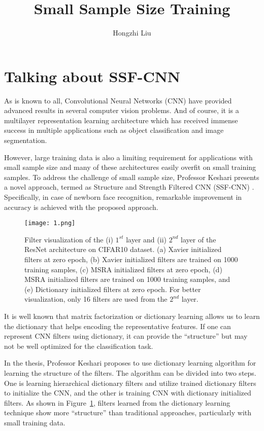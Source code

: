 \documentclass[twocolumn]{article}
\author{Hongzhi Liu}
\title{Small Sample Size Training}
\begin{document}
	\maketitle
	\par
	\section{Talking about SSF-CNN}
	As is known to all, Convolutional Neural Networks (CNN) have provided advanced results in several computer vision problems. And of course, it is a multilayer representation learning architecture which has received immense success in multiple applications such as object classification and image segmentation.
	
	However, large training data is also a limiting requirement for applications with small sample size and many of these architectures easily overfit on small training samples. To address the challenge of small sample size, Professor Keshari presents a novel approach, termed as Structure and Strength Filtered CNN (SSF-CNN) \cite{DBLP:journals/corr/abs-1803-11405}. Specifically, in case of newborn face recognition, remarkable improvement in accuracy is achieved with the proposed approach.
	\begin{figure}[ht]
		\centering
		\texttt{[image: 1.png]}
		\caption{Filter visualization of the (i) $1^{st}$ layer and (ii) $2^{nd}$ layer of the ResNet architecture on CIFAR10 dataset. (a) Xavier \cite{Glorot2010Understanding} initialized filters at zero epoch, (b) Xavier initialized filters are trained on 1000 training samples, (c) MSRA \cite{He2015Delving}initialized filters at zero epoch, (d) MSRA initialized filters are trained on 1000 training samples, and (e) Dictionary initialized filters at zero epoch. For better visualization, only 16 filters are used from the $2^{nd}$ layer.}\label{structure}
	\end{figure}
   
   It is well known that matrix factorization or dictionary learning allows us to learn the dictionary that helps encoding the representative features. If one can represent CNN filters using dictionary, it can provide the ``structure'' but may not be well optimized for the classification task. 

   In the thesis, Professor Keshari proposes to use dictionary learning algorithm for learning the structure of the filters. The algorithm can be divided into two steps. One is learning hierarchical dictionary filters and utilize trained dictionary filters to initialize the CNN, and the other is training CNN with dictionary initialized filters. As shown in Figure~\ref{structure}, filters learned from the dictionary learning technique show more ``structure'' than traditional approaches, particularly with small training data.
   
\end{document}
